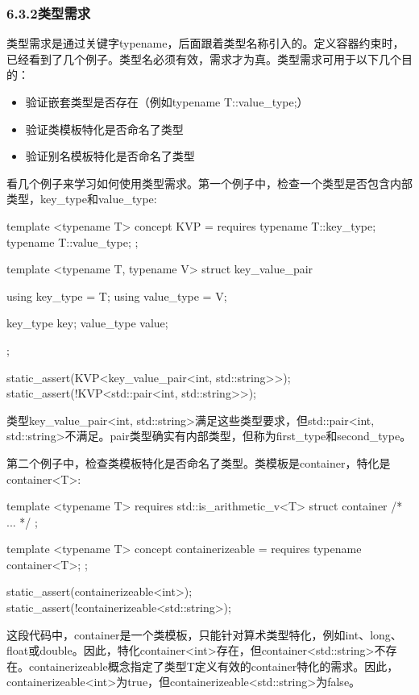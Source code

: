 \subsubsection{6.3.2\hspace{0.2cm}类型需求}

类型需求是通过关键字typename，后面跟着类型名称引入的。定义容器约束时，已经看到了几个例子。类型名必须有效，需求才为真。类型需求可用于以下几个目的：

\begin{itemize}
\item
验证嵌套类型是否存在（例如typename T::value\_type;）

\item
验证类模板特化是否命名了类型

\item
验证别名模板特化是否命名了类型
\end{itemize}

看几个例子来学习如何使用类型需求。第一个例子中，检查一个类型是否包含内部类型，key\_type和value\_type:

\begin{cpp}
template <typename T>
concept KVP = requires
{
	typename T::key_type;
	typename T::value_type;
};

template <typename T, typename V>
struct key_value_pair
{
	using key_type = T;
	using value_type = V;
	
	key_type key;
	value_type value;
};

static_assert(KVP<key_value_pair<int, std::string>>);
static_assert(!KVP<std::pair<int, std::string>>);
\end{cpp}

类型key\_value\_pair<int, std::string>满足这些类型要求，但std::pair<int, std::string>不满足。pair类型确实有内部类型，但称为first\_type和second\_type。

第二个例子中，检查类模板特化是否命名了类型。类模板是container，特化是container<T>:

\begin{cpp}
template <typename T>
requires std::is_arithmetic_v<T>
struct container
{ /* ... */ };

template <typename T>
concept containerizeable = requires {
	typename container<T>;
};

static_assert(containerizeable<int>);
static_assert(!containerizeable<std::string>);
\end{cpp}

这段代码中，container是一个类模板，只能针对算术类型特化，例如int、long、float或double。因此，特化container<int>存在，但container<std::string>不存在。containerizeable概念指定了类型T定义有效的container特化的需求。因此，containerizeable<int>为true，但containerizeable<std::string>为false。

